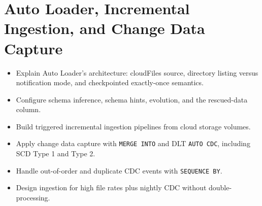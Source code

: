 \chapter{Auto Loader, Incremental Ingestion, and Change Data Capture}
%
%
\begin{objectives}
\begin{itemize}
    \item Explain Auto Loader's architecture: cloudFiles source, directory listing versus notification mode, and checkpointed exactly-once semantics.
    \item Configure schema inference, schema hints, evolution, and the rescued-data column.
    \item Build triggered incremental ingestion pipelines from cloud storage volumes.
    \item Apply change data capture with \texttt{MERGE INTO} and DLT \texttt{AUTO CDC}, including SCD Type 1 and Type 2.
    \item Handle out-of-order and duplicate CDC events with \texttt{SEQUENCE BY}.
    \item Design ingestion for high file rates plus nightly CDC without double-processing.
\end{itemize}
\end{objectives}

